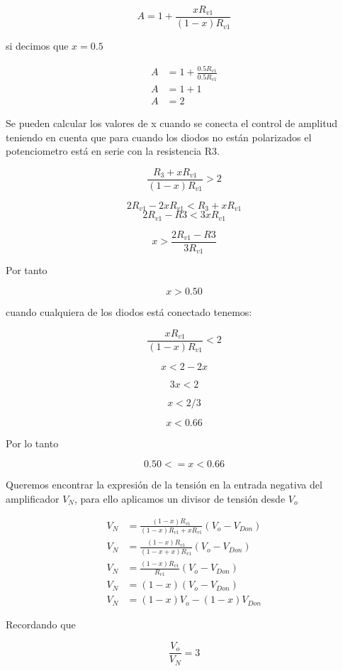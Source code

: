 \begin{equation}
    A = 1 + \frac{x R_{v1}}{(1-x)R_{v1}}
\end{equation}

si decimos que $x=0.5$ 

\begin{align*}
    A &= 1 + \frac{0.5 R_{v1}}{0.5 R_{v1}} \\
    A &= 1 + 1 \\
    A &= 2
\end{align*}

Se pueden calcular los valores de x cuando se conecta el control de amplitud teniendo en cuenta que para cuando los diodos no están polarizados el potenciometro está en serie con la resistencia R3.

\[ \frac{R_3 + xR_{v1}}{(1-x)R_{v1}} > 2 \]

$$ 2 R_{v1} - 2x R_{v1} < R_3 + x R_{v1} $$
$$ 2 R_{v1} - R3 < 3 x R_{v1} $$

$$ x > \frac{2R_{v1} - R3}{3 R_{v1}}$$

Por tanto

$$ x > 0.50 $$


cuando cualquiera de los diodos está conectado tenemos:

\[ \frac{xR_{v1}}{(1-x)R_{v1}} < 2 \]

$$ x < 2 - 2x$$

$$ 3 x < 2 $$

$$ x < 2/3 $$

$$ x < 0.66 $$

Por lo tanto

$$ 0.50 <= x < 0.66 $$


Queremos encontrar la expresión de la tensión en la entrada negativa del amplificador $V_N$, para ello aplicamos un divisor de tensión desde $V_o$

\begin{align*}
    V_N &= \frac{(1-x)R_{v1}}{(1-x)R_{v1} + x R_{v1}}(V_o - V_{Don}) \\
    V_N &= \frac{(1-x)R_{v1}}{(1-x +x)R_{v1}}(V_o - V_{Don})\\
    V_N &= \frac{(1-x)R_{v1}}{R_{v1}}(V_o - V_{Don}) \\
    V_N &= (1-x)(V_o - V_{Don}) \\
    V_N &= (1-x)V_o - (1-x)V_{Don} 
\end{align*}

Recordando que 

\begin{equation}
    \frac{V_o}{V_N} = 3
\end{equation}

